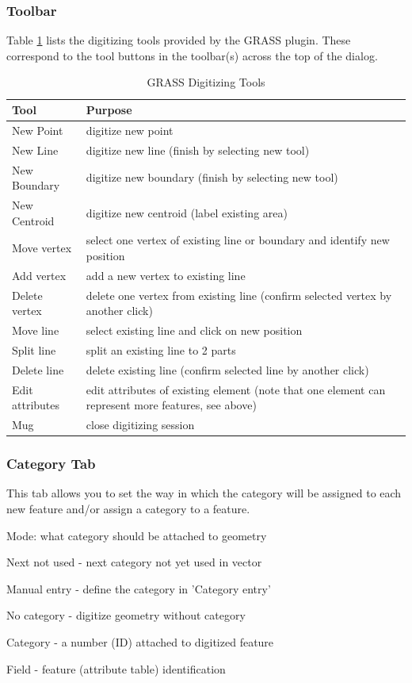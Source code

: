 \documentclass[10pt,english]{article}
\begin{document}
\begin{onehalfspace}
\subsubsection{Toolbar}
Table \ref{tab:grass_tools} lists the digitizing tools provided by the GRASS plugin. These correspond to the tool buttons in the toolbar(s) across the top of the dialog.
\begin{table}[h]
\centering
\caption{GRASS Digitizing Tools}\label{tab:grass_tools}\medskip
 \begin{tabular}{|l|p{5in}|}
 \hline \textbf{Tool} & \textbf{Purpose} \\
\hline New Point & digitize new point \\
\hline New Line &  digitize new line (finish by selecting new tool) \\
\hline New Boundary & digitize new boundary (finish by selecting new tool)\\
\hline New Centroid & digitize new centroid (label existing area)\\
\hline Move vertex & select one vertex of existing line or boundary and identify new position\\
\hline Add vertex & add a new vertex to existing line\\
\hline Delete vertex & delete one vertex from existing line (confirm selected vertex by another click)\\
\hline Move line & select existing line and click on new position\\
\hline Split line & split an existing line to 2 parts\\
\hline Delete line & delete existing line (confirm selected line by another click)\\
\hline Edit attributes & edit attributes of existing element (note that one element can represent more features, see above)\\
\hline Mug & close digitizing session\\
\hline
\end{tabular}
\end{table}
\subsubsection{Category Tab}
This tab allows you to set the way in which the category will be assigned to each new feature and/or assign a category to a feature.
\begin{compactitem}
\item Mode: what category should be attached to geometry
\begin{compactitem}
\item Next not used - next category not yet used in vector
\item Manual entry - define the category in 'Category entry'
\item No category - digitize geometry without category
\end{compactitem}
\item Category - a number (ID) attached to digitized feature
\item Field - feature (attribute table) identification
\end{compactitem}

\end{onehalfspace}
\end{document}
